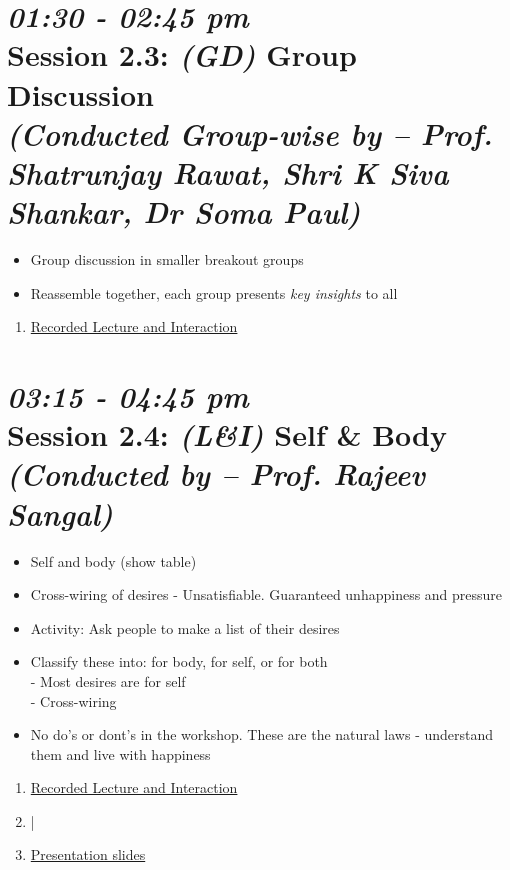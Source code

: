 \documentclass[11pt]{article}
\begin{document}
    \section*{{\it 01:30 - 02:45 pm} \\
    Session 2.3: {\it (GD)} Group Discussion \\
    {\Large\it (Conducted Group-wise by -- Prof. Shatrunjay Rawat, Shri K Siva Shankar, Dr Soma Paul)}}

    \begin{itemize}
        \item Group discussion in smaller breakout groups
        \item Reassemble together, each group presents {\em key insights} to all
    \end{itemize}

    \begin{enumerate}
        \item \href{https://www.youtube.com/watch?v=hy1ghWDLmNs}{Recorded Lecture and Interaction}
    \end{enumerate}

    \section*{{\it 03:15 - 04:45 pm} \\
    Session 2.4: {\it (L\&I)} Self \& Body \\
    {\Large\it (Conducted by -- Prof. Rajeev Sangal)}}

    \begin{itemize}
        \item Self and body (show table)
        \item Cross-wiring of desires - Unsatisfiable. Guaranteed unhappiness and pressure
        \item Activity: Ask people to make a list of their desires
        \item Classify these into: for body, for self, or for both \\
        - Most desires are for self\\
        - Cross-wiring
        \item No do's or dont's in the workshop. These are the natural laws -
        understand them and live with happiness
    \end{itemize}

    \begin{enumerate}
        \item \href{https://www.youtube.com/watch?v=WELvmD1FFAA}{Recorded Lecture and Interaction}
        \item |
        \item \href{presentations/day2/self_and_body.pdf}{Presentation slides}
    \end{enumerate}
\end{document}
